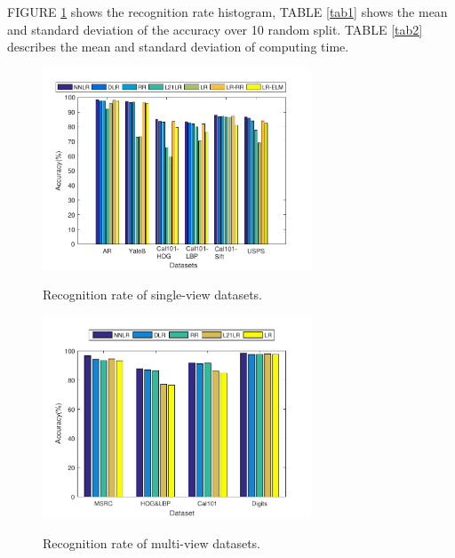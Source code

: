 \documentclass{ieeeaccess}
\begin{document}
FIGURE \ref{fig2} shows the recognition rate histogram, TABLE \ref{tab1} shows the mean and standard deviation of the accuracy over 10 random split. TABLE \ref{tab2} describes the mean and standard deviation of computing time.



\begin{figure}[t]
  \centering
  \includegraphics[width=8cm]{single_view}\\
  \caption{Recognition rate of single-view datasets.}\label{fig2}
\end{figure}

\begin{figure}[t]
  \centering
  \includegraphics[width=8cm]{multi_view}\\
  \caption{Recognition rate of multi-view datasets.}\label{fig3}
\end{figure}
\end{document}
